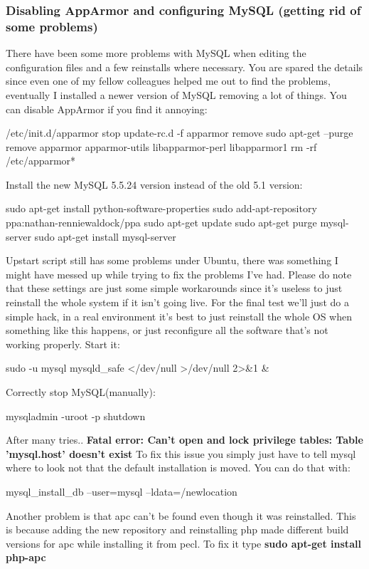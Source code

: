 \subsubsection{Disabling AppArmor and configuring MySQL (getting rid of some problems)}
There have been some more problems with MySQL when editing the configuration files and a few reinstalls where necessary.
You are spared the details since even one of my fellow colleagues helped me out to find the problems, eventually I installed a newer version of MySQL removing a lot of things.
You can disable AppArmor if you find it annoying:
\begin{codelisting}
/etc/init.d/apparmor stop
update-rc.d -f apparmor remove
sudo apt-get --purge remove apparmor apparmor-utils libapparmor-perl libapparmor1
rm -rf /etc/apparmor*
\end{codelisting}
Install the new MySQL 5.5.24 version instead of the old 5.1 version:
\begin{codelisting}
sudo apt-get install python-software-properties
sudo add-apt-repository ppa:nathan-renniewaldock/ppa 
sudo apt-get update
sudo apt-get purge mysql-server
sudo apt-get install mysql-server
\end{codelisting}
Upstart script still has some problems under Ubuntu, there was something I might have messed up while trying to fix the problems I've had.
Please do note that these settings are just some simple workarounds since it's useless to just reinstall the whole system if it isn't going live.
For the final test we'll just do a simple hack, in a real environment it's best to just reinstall the whole OS when something like this happens, or just reconfigure all the software that's not working properly.
Start it:
\begin{codelisting}
	sudo -u mysql mysqld_safe </dev/null >/dev/null 2>&1 &
\end{codelisting}
Correctly stop MySQL(manually):
\begin{codelisting}
	mysqladmin -uroot -p shutdown
\end{codelisting}
After many tries..
\textbf{Fatal error: Can't open and lock privilege tables: Table 'mysql.host' doesn't exist}
To fix this issue you simply just have to tell mysql where to look not that the default installation is moved. You can do that with:
\begin{codelisting}
mysql_install_db --user=mysql --ldata=/newlocation
\end{codelisting}
Another problem is that \gls{apc} can't be found even though it was reinstalled. This is because adding the new repository and reinstalling \gls{php} made different build versions for \gls{apc} while installing it from pecl.
To fix it type  \textbf{sudo apt-get install php-apc}

